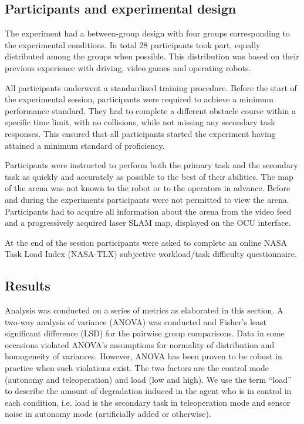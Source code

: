 \documentclass[a4paper,12pt,oneside,openright]{bhamthesis}
\begin{document}
\subsection{Participants and experimental design}

The experiment had a between-group design with four groups corresponding to the experimental conditions. In total 28 participants took part, equally distributed among the groups when possible. This distribution was based on their previous experience with driving, video games and operating robots. 

All participants underwent a standardized training procedure. Before the start of the experimental session, participants were required to achieve a minimum performance standard. They had to complete a different obstacle course within a specific time limit, with no collisions, while not missing any secondary task responses. This ensured that all participants started the experiment having attained a minimum standard of proficiency.

Participants were instructed to perform both the primary task and the secondary task as quickly and accurately as possible to the best of their abilities. The map of the arena was not known to the robot or to the operators in advance. Before and during the experiments participants were not permitted to view the arena. Participants had to acquire all information about the arena from the video feed and a progressively acquired laser SLAM map, displayed on the OCU interface.

At the end of the session participants were asked to complete an online NASA Task Load Index (NASA-TLX) \cite{Sharek2011} subjective workload/task difficulty questionnaire.

\subsection{Results}

Analysis was conducted on a series of metrics as elaborated in this section. A two-way analysis of variance (ANOVA) was conducted and Fisher's least significant difference (LSD) for the pairwise group comparisons. Data in some occasions violated ANOVA's assumptions for normality of distribution and homogeneity of variances. However, ANOVA has been proven to be robust in practice when such violations exist. The two factors are the control mode (autonomy and teleoperation) and load (low and high). We use the term ``load'' to describe the amount of degradation induced in the agent who is in control in each condition, i.e. load is the secondary task in teleoperation mode and sensor noise in autonomy mode (artificially added or otherwise). 
\end{document}
